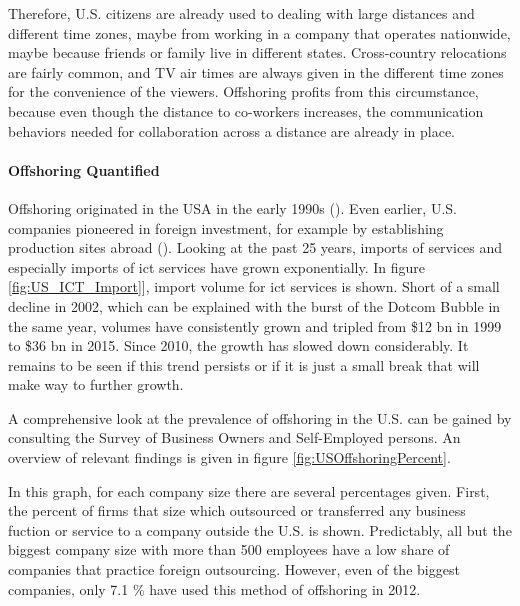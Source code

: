 Therefore, U.S. citizens are already used to dealing with large distances and different time zones, maybe from working in a company that operates nationwide, maybe because friends or family live in different states. Cross-country relocations are fairly common, and TV air times are always given in the different time zones for the convenience of the viewers. Offshoring profits from this circumstance, because even though the distance to co-workers increases, the communication behaviors needed for collaboration across a distance are already in place.



\paragraph{Offshoring Quantified}
Offshoring originated in the USA in the early 1990s (\cite[p. 389]{Pisani.2016}). Even earlier, U.S. companies pioneered in foreign investment, for example by establishing production sites abroad (\cite[p. 5]{Kozlow.2006}). Looking at the past 25 years, imports of services and especially imports of \gls{ict} services have grown exponentially. In figure \ref{fig:US_ICT_Import}], import volume for \gls{ict} services is shown. Short of a small decline in 2002, which can be explained with the burst of the Dotcom Bubble in the same year, volumes have consistently grown and tripled from \$12 bn in 1999 to \$36 bn in 2015. Since 2010, the growth has slowed down considerably. It remains to be seen if this trend persists or if it is just a small break that will make way to further growth.


A comprehensive look at the prevalence of offshoring in the U.S. can be gained by consulting the Survey of Business Owners and Self-Employed persons. An overview of relevant findings is given in figure \ref{fig:USOffshoringPercent}.

In this graph, for each company size there are several percentages given. First, the percent of firms that size which outsourced or transferred any business fuction or service to a company outside the U.S. is shown. Predictably, all but the biggest company size with more than 500 employees have a low share of companies that practice foreign outsourcing. However, even of the biggest companies, only 7.1 \% have used this method of offshoring in 2012.

